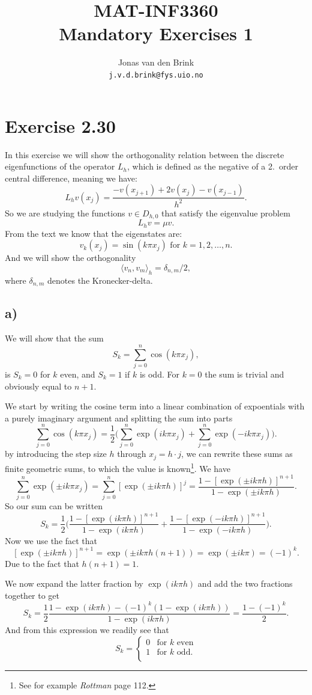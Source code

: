 \documentclass[a4paper, 11pt, notitlepage, english]{article}
\author{Jonas van den Brink \\ \texttt{j.v.d.brink@fys.uio.no}}
\title{MAT-INF3360 \\ Mandatory Exercises 1}
\begin{document}
\maketitle
\section*{Exercise 2.30}
In this exercise we will show the orthogonality relation between the discrete eigenfunctions of the operator $L_h$, which is defined as the negative of a 2.\ order central difference, meaning we have:
$$L_h v(x_j) = \frac{-v(x_{j+1}) + 2v(x_j) - v(x_{j-1})}{h^2}.$$
So we are studying the functions $v \in D_{h,0}$ that satisfy the eigenvalue problem
$$L_h v = \mu v.$$
From the text we know that the eigenstates are:
$$v_k(x_j) = \sin(k\pi x_j) \mbox{ for } k=1,2,\ldots,n.$$
And we will show the orthogonality
$$\langle v_n, v_m\rangle_h = \delta_{n,m}/2,$$
where $\delta_{n,m}$ denotes the Kronecker-delta.

\subsection*{a)}
We will show that the sum
$$S_k = \sum_{j=0}^n \cos(k\pi x_j),$$
is $S_k = 0$ for $k$ even, and $S_k=1$ if $k$ is odd. For $k=0$ the sum is trivial and obviously equal to $n+1$.

We start by writing the cosine term into a linear combination of expoentials with a purely imaginary argument and splitting the sum into parts
$$\sum_{j=0}^n \cos(k\pi x_j) = \frac{1}{2}\bigg(\sum_{j=0}^n \exp(ik\pi x_j)+ \sum_{j=0}^n \exp(-ik\pi x_j)\bigg).$$
by introducing the step size $h$ through $x_j = h\cdot j$, we can rewrite these sums as finite geometric sums, to which the value is known\footnote{See for example \emph{Rottman} page 112.}. We have
$$\sum_{j=0}^n \exp(\pm ik\pi x_j) = \sum_{j=0}^n [\exp(\pm ik\pi h)]^j = \frac{1-[\exp(\pm ik\pi h)]^{n+1}}{1 - \exp(\pm ik\pi h)}.$$
So our sum can be written
$$S_k = \frac{1}{2}\bigg(\frac{1-[\exp(ik\pi h)]^{n+1}}{1 - \exp(ik\pi h)} + \frac{1-[\exp(- ik\pi h)]^{n+1}}{1 - \exp(- ik\pi h)}\bigg).$$
Now we use the fact that
$$[\exp(\pm ik\pi h)]^{n+1} = \exp(\pm ik\pi h (n+1)) = \exp(\pm ik\pi) = (-1)^k.$$
Due to the fact that $h(n+1)=1$. 

We now expand the latter fraction by $\exp(ik\pi h)$ and add the two fractions together to get
$$S_k = \frac{1}{2}\frac{1-\exp(ik\pi h) - (-1)^k(1 - \exp(ik\pi h))}{1 - \exp(ik\pi h)} = \frac{1 - (-1)^k}{2}.$$
And from this expression we readily see that
$$S_k = \begin{cases}
    0 & \mbox{for $k$ even} \\
    1 & \mbox{for $k$ odd}.\\
\end{cases}$$
\end{document}
